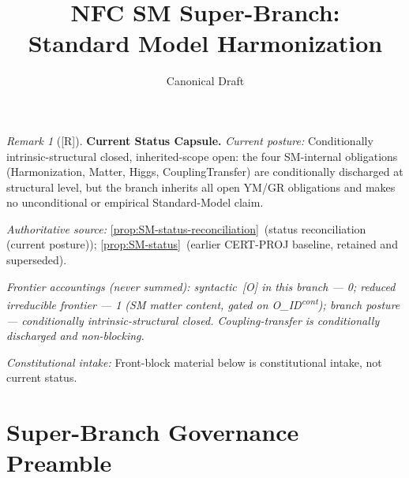 \documentclass[12pt,oneside]{amsbook}
\theoremstyle{plain}
\theoremstyle{definition}
\theoremstyle{remark}
\newtheorem{remark}[theorem]{Remark}
\newcommand{\status}[1]{\textup{[#1]}}
\begin{document}
\title{NFC SM Super-Branch:\\
 Standard Model Harmonization}
\date{Canonical Draft}
\maketitle
\tableofcontents


\begin{remark}[\status{R}]\label{cap:SM-status}
\textbf{Current Status Capsule.}
\emph{Current posture:} Conditionally intrinsic-structural closed, inherited-scope open: the four SM-internal obligations (Harmonization, Matter, Higgs, CouplingTransfer) are conditionally discharged at structural level, but the branch inherits all open YM/GR obligations and makes no unconditional or empirical Standard-Model claim.

\emph{Authoritative source:} \ref{prop:SM-status-reconciliation}~(status reconciliation (current posture)); \ref{prop:SM-status}~(earlier CERT-PROJ baseline, retained and superseded).

\emph{Frontier accountings (never summed): syntactic~[O] in this branch --- 0; reduced irreducible frontier --- 1 (SM matter content, gated on O\_ID\textsuperscript{cont}); branch posture --- conditionally intrinsic-structural closed. Coupling-transfer is conditionally discharged and non-blocking.}

\emph{Constitutional intake:} Front-block material below is constitutional intake, not current status.
\end{remark}

\section{Super-Branch Governance Preamble}
\label{sec:sm-governance}
\end{document}
